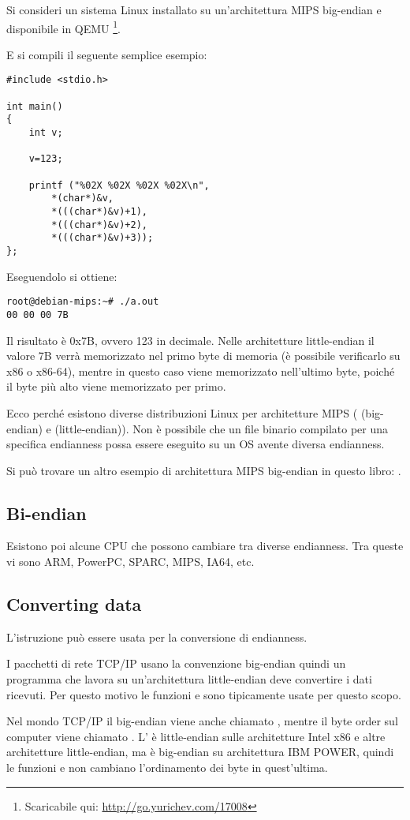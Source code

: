 Si consideri un sistema Linux installato su un'architettura MIPS big-endian e disponibile in QEMU
\footnote{Scaricabile qui: \url{http://go.yurichev.com/17008}}.

E si compili il seguente semplice esempio:

\begin{lstlisting}[style=customc]
#include <stdio.h>

int main()
{
	int v;

	v=123;

	printf ("%02X %02X %02X %02X\n", 
		*(char*)&v,
		*(((char*)&v)+1),
		*(((char*)&v)+2),
		*(((char*)&v)+3));
};
\end{lstlisting}

Eseguendolo si ottiene:

\begin{lstlisting}
root@debian-mips:~# ./a.out 
00 00 00 7B
\end{lstlisting}

Il risultato è
0x7B, ovvero 123 in decimale.
Nelle architetture little-endian il valore 7B verrà memorizzato nel primo byte di memoria (è possibile verificarlo su x86 o x86-64), 
mentre in questo caso viene memorizzato nell'ultimo byte, poiché il byte più alto viene memorizzato per primo.

Ecco perché esistono diverse distribuzioni Linux per architetture MIPS
( (big-endian) e  (little-endian)).
Non è possibile che un file binario compilato per una specifica endianness possa essere eseguito su un \ac{OS} avente diversa endianness.

Si può trovare un altro esempio di architettura MIPS big-endian in questo libro: .

\subsection{Bi-endian}

Esistono poi alcune CPU che possono cambiare tra diverse endianness. Tra queste vi sono ARM, PowerPC, SPARC, MIPS, \ac{IA64}, etc.

\subsection{Converting data}

L'istruzione  può essere usata per la conversione di endianness.

I pacchetti di rete TCP/IP usano la convenzione big-endian quindi un programma che lavora su un'architettura little-endian deve convertire i dati ricevuti.
Per questo motivo le funzioni  e  sono tipicamente usate per questo scopo.

Nel mondo TCP/IP il big-endian viene anche chiamato , mentre il byte order sul computer viene chiamato .
L' è little-endian sulle architetture Intel x86 e altre architetture little-endian,
ma è big-endian su architettura IBM POWER, quindi le funzioni  e  non cambiano l'ordinamento dei byte in quest'ultima.


